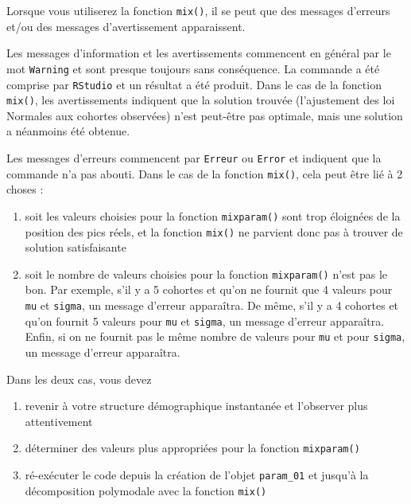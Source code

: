 \documentclass[
  a4paper,
  DIV=11,
  numbers=noendperiod,
  oneside]{scrreprt}
\providecommand{\tightlist}{%
  \setlength{\itemsep}{0pt}\setlength{\parskip}{0pt}}\usepackage{longtable,booktabs,array}
\begin{document}
Lorsque vous utiliserez la fonction \texttt{mix()}, il se peut que des
messages d'erreurs et/ou des messages d'avertissement apparaissent.

{} Les messages d'information et les avertissements
commencent en général par le mot \texttt{Warning} et sont presque
toujours sans conséquence. La commande a été comprise par
\texttt{RStudio} et un résultat a été produit. Dans le cas de la
fonction \texttt{mix()}, les avertissements indiquent que la solution
trouvée (l'ajustement des loi Normales aux cohortes observées) n'est
peut-être pas optimale, mais une solution a néanmoins été obtenue.

{} Les messages d'erreurs commencent par \texttt{Erreur} ou
\texttt{Error} et indiquent que la commande n'a pas abouti. Dans le cas
de la fonction \texttt{mix()}, cela peut être lié à 2 choses :

\begin{enumerate}
\def\labelenumi{\arabic{enumi}.}
\tightlist
\item
  soit les valeurs choisies pour la fonction \texttt{mixparam()} sont
  trop éloignées de la position des pics réels, et la fonction
  \texttt{mix()} ne parvient donc pas à trouver de solution
  satisfaisante
\item
  soit le nombre de valeurs choisies pour la fonction
  \texttt{mixparam()} n'est pas le bon. Par exemple, s'il y a 5 cohortes
  et qu'on ne fournit que 4 valeurs pour \texttt{mu} et \texttt{sigma},
  un message d'erreur apparaîtra. De même, s'il y a 4 cohortes et qu'on
  fournit 5 valeurs pour \texttt{mu} et \texttt{sigma}, un message
  d'erreur apparaîtra. Enfin, si on ne fournit pas le même nombre de
  valeurs pour \texttt{mu} et pour \texttt{sigma}, un message d'erreur
  apparaîtra.
\end{enumerate}

Dans les deux cas, vous devez

\begin{enumerate}
\def\labelenumi{\arabic{enumi}.}
\tightlist
\item
  revenir à votre structure démographique instantanée et l'observer plus
  attentivement
\item
  déterminer des valeurs plus appropriées pour la fonction \texttt{mixparam()}
\item
  ré-exécuter le code depuis la création de l'objet \texttt{param\_01}
  et jusqu'à la décomposition polymodale avec la fonction \texttt{mix()}
\end{enumerate}
\end{document}
